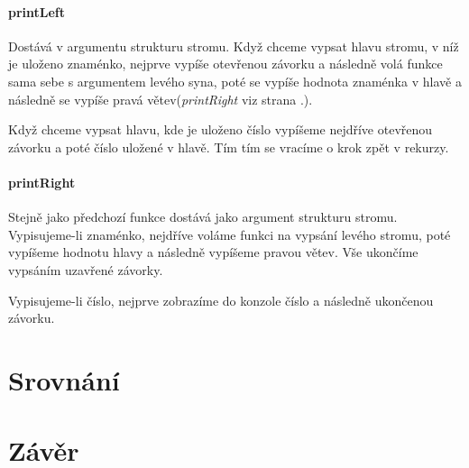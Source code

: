 \documentclass[12pt,a4paper]{report}
\begin{document}
\subsubsection{printLeft} \label{printLeft}
Dostává v argumentu strukturu stromu. Když chceme vypsat hlavu stromu, v níž je uloženo znaménko, nejprve vypíše otevřenou závorku a následně volá funkce sama sebe s argumentem levého syna, poté se vypíše hodnota znaménka v hlavě a následně se vypíše pravá větev(\textit{printRight} viz strana \pageref{printRight}.).

Když chceme vypsat hlavu, kde je uloženo číslo vypíšeme nejdříve otevřenou závorku a poté číslo uložené v hlavě. Tím tím se vracíme o krok zpět v rekurzy.
\newpage
\subsubsection{printRight} \label{printRight}
Stejně jako předchozí funkce dostává jako argument strukturu stromu. Vypisujeme-li znaménko, nejdříve voláme funkci na vypsání levého stromu, poté vypíšeme hodnotu hlavy a následně vypíšeme pravou větev. Vše ukončíme vypsáním uzavřené závorky.

Vypisujeme-li číslo, nejprve zobrazíme do konzole číslo a následně ukončenou závorku. 
\chapter{Srovnání}

\chapter{Závěr}
\end{document}

